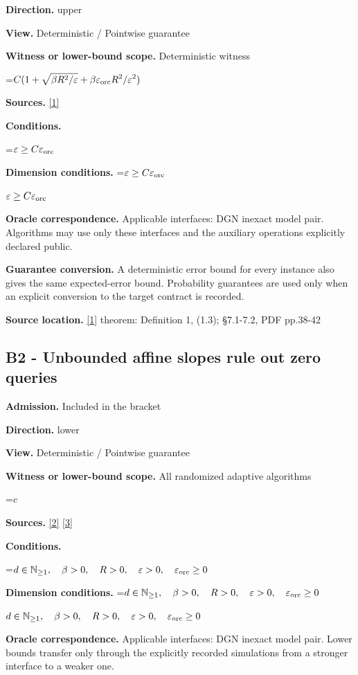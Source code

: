\documentclass[10pt,a4paper]{article}
\newcommand{\AtlasMath}[1]{\par\begingroup\centering\setbox0=\hbox{$\displaystyle #1$}\ifdim\wd0>1.4\linewidth\typeout{ATLAS WIDE FORMULA: \the\wd0}\fi\ifdim\wd0>\linewidth\resizebox{\linewidth}{!}{\box0}\else\box0\fi\par\endgroup}
\newcommand{\AtlasInlineMath}[1]{\begingroup\setbox0=\hbox{$#1$}\ifdim\wd0>.4\linewidth\endgroup\AtlasMath{#1}\else\endgroup$#1$\fi}
\begin{document}
\textbf{Direction.} upper

\textbf{View.} Deterministic / Pointwise guarantee

\textbf{Witness or lower-bound scope.} Deterministic witness

\AtlasMath{C(1+\sqrt{\beta R^2/\varepsilon}+\beta\varepsilon_{\rm orc}R^2/\varepsilon^2)}
\textbf{Sources.} \href{https://optimization-online.org/wp-content/uploads/2014/03/4279.pdf}{[1]}

\textbf{Conditions.} 
\AtlasMath{\varepsilon\ge C\varepsilon_{\rm orc}}


\textbf{Dimension conditions.} \AtlasInlineMath{\varepsilon\ge C\varepsilon_{\rm orc}}

\textbf{Oracle correspondence.} Applicable interfaces: DGN inexact model pair. Algorithms may use only these interfaces and the auxiliary operations explicitly declared public.

\textbf{Guarantee conversion.} A deterministic error bound for every instance also gives the same expected-error bound. Probability guarantees are used only when an explicit conversion to the target contract is recorded.

\textbf{Source location.} \href{https://optimization-online.org/wp-content/uploads/2014/03/4279.pdf}{[1]} theorem: Definition 1, (1.3); §7.1-7.2, PDF pp.38-42

\subsection{B2 - Unbounded affine slopes rule out zero queries}
\textbf{Admission.} Included in the bracket

\textbf{Direction.} lower

\textbf{View.} Deterministic / Pointwise guarantee

\textbf{Witness or lower-bound scope.} All randomized adaptive algorithms

\AtlasMath{c}
\textbf{Sources.} \href{https://arxiv.org/pdf/2609.10874}{[2]} \href{https://arxiv.org/pdf/1407.5144}{[3]}

\textbf{Conditions.} 
\AtlasMath{d\in\mathbb{N}_{\ge1},\quad \beta>0,\quad R>0,\quad \varepsilon>0,\quad \varepsilon_{\rm orc}\ge0}


\textbf{Dimension conditions.} \AtlasInlineMath{d\in\mathbb{N}_{\ge1},\quad \beta>0,\quad R>0,\quad \varepsilon>0,\quad \varepsilon_{\rm orc}\ge0}

\textbf{Oracle correspondence.} Applicable interfaces: DGN inexact model pair. Lower bounds transfer only through the explicitly recorded simulations from a stronger interface to a weaker one.
\end{document}
